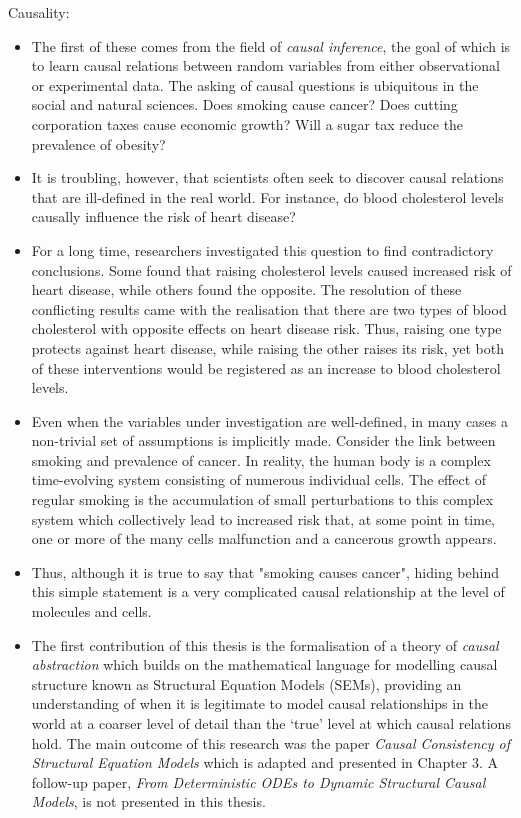 Causality:

\begin{itemize}
\item The first of these comes from the field of \emph{causal inference}, the goal of which is to learn causal relations between random variables from either observational or experimental data. The asking of causal questions is ubiquitous in the social and natural sciences. Does smoking cause cancer? Does cutting corporation taxes cause economic growth? Will a sugar tax reduce the prevalence of obesity?
\item It is troubling, however, that scientists often seek to discover causal relations that are ill-defined in the real world. For instance, do blood cholesterol levels causally influence the risk of heart disease? 
\item For a long time, researchers investigated this question to find contradictory conclusions. Some found that raising cholesterol levels caused increased risk of heart disease, while others found the opposite. The resolution of these conflicting results came with the realisation that there are two types of blood cholesterol with opposite effects on heart disease risk. Thus, raising one type protects against heart disease, while raising the other raises its risk, yet both of these interventions would be registered as an increase to blood cholesterol levels.
\item Even when the variables under investigation are well-defined, in many cases a non-trivial set of assumptions is implicitly made. Consider the link between smoking and prevalence of cancer. In reality, the human body is a complex time-evolving system consisting of numerous individual cells. The effect of regular smoking is the accumulation of small perturbations to this complex system which collectively lead to increased risk that, at some point in time, one or more of the many cells malfunction and a cancerous growth appears. 
\item Thus, although it is true to say that "smoking causes cancer", hiding behind this simple statement is a very complicated causal relationship at the level of molecules and cells.
\item The first contribution of this thesis is the formalisation of a theory of \emph{causal abstraction} which builds on the mathematical language for modelling causal structure known as Structural Equation Models (SEMs), providing an understanding of when it is legitimate to model causal relationships in the world at a coarser level of detail than the `true' level at which causal relations hold. The main outcome of this research was the paper \emph{Causal Consistency of Structural Equation Models} which is adapted and presented in Chapter 3. A follow-up paper, \emph{From Deterministic ODEs to Dynamic Structural Causal Models}, is not presented in this thesis. %
\end{itemize}

